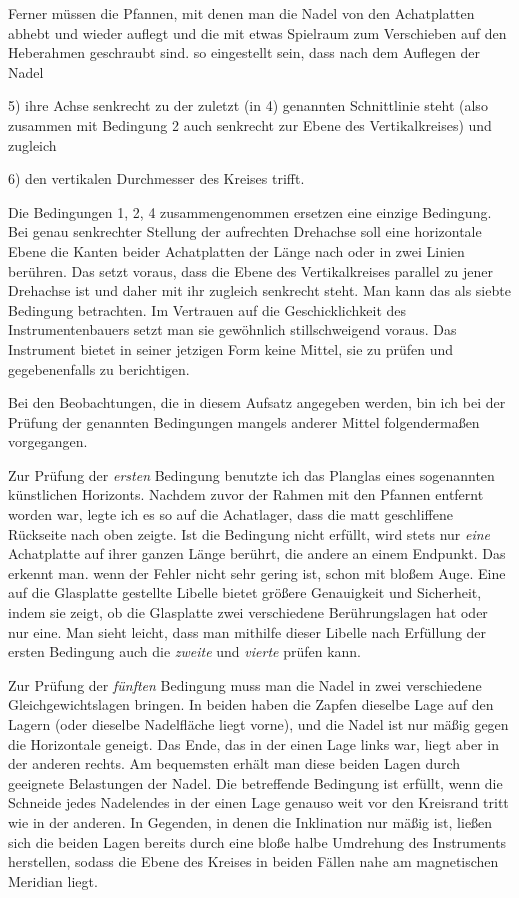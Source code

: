 Ferner müssen die Pfannen, mit denen man die Nadel von den Achatplatten abhebt und wieder auflegt und die mit etwas Spielraum zum Verschieben auf den Heberahmen geschraubt sind. so eingestellt sein, dass nach dem Auflegen der Nadel

5) ihre Achse senkrecht zu der zuletzt (in 4) genannten Schnittlinie steht (also zusammen mit Bedingung 2 auch senkrecht zur Ebene des Vertikalkreises) und zugleich

6) den vertikalen Durchmesser des Kreises trifft.

Die Bedingungen 1, 2, 4 zusammengenommen ersetzen eine einzige Bedingung. Bei genau senkrechter Stellung der aufrechten Drehachse soll eine horizontale Ebene die Kanten beider Achatplatten der Länge nach oder in zwei Linien berühren. Das setzt voraus, dass die Ebene des Vertikalkreises parallel zu jener Drehachse ist und daher mit ihr zugleich senkrecht steht. Man kann das als siebte Bedingung betrachten. Im Vertrauen auf die Geschicklichkeit des Instrumentenbauers setzt man sie gewöhnlich stillschweigend voraus. Das Instrument bietet in seiner jetzigen Form keine Mittel, sie zu prüfen und gegebenenfalls zu berichtigen.

Bei den Beobachtungen, die in diesem Aufsatz angegeben werden, bin ich bei der Prüfung der genannten Bedingungen mangels anderer Mittel folgendermaßen vorgegangen.

Zur Prüfung der \textit{ersten} Bedingung benutzte ich das Planglas eines sogenannten künstlichen Horizonts. Nachdem zuvor der Rahmen mit den Pfannen entfernt worden war, legte ich es so auf die Achatlager, dass die matt geschliffene Rückseite nach oben zeigte. Ist die Bedingung nicht erfüllt, wird stets nur \textit{eine} Achatplatte auf ihrer ganzen Länge berührt, die andere an einem Endpunkt. Das erkennt man. wenn der Fehler nicht sehr gering ist, schon mit bloßem Auge. Eine auf die Glasplatte gestellte Libelle bietet größere Genauigkeit und Sicherheit, indem sie zeigt, ob die Glasplatte zwei verschiedene Berührungslagen hat oder nur eine. Man sieht leicht, dass man mithilfe dieser Libelle nach Erfüllung der ersten Bedingung auch die \textit{zweite} und \textit{vierte} prüfen kann.

Zur Prüfung der \textit{fünften} Bedingung muss man die Nadel in zwei verschiedene Gleichgewichtslagen bringen. In beiden haben die Zapfen dieselbe Lage auf den Lagern (oder dieselbe Nadelfläche liegt vorne), und die Nadel ist nur mäßig gegen die Horizontale geneigt. Das Ende, das in der einen Lage links war, liegt aber in der anderen rechts. Am bequemsten erhält man diese beiden Lagen durch geeignete Belastungen der Nadel. Die betreffende Bedingung ist erfüllt, wenn die Schneide jedes Nadelendes in der einen Lage genauso weit vor den Kreisrand tritt wie in der anderen. In Gegenden, in denen die Inklination nur mäßig ist, ließen sich die beiden Lagen bereits durch eine bloße halbe Umdrehung des Instruments herstellen, sodass die Ebene des Kreises in beiden Fällen nahe am magnetischen Meridian liegt.

